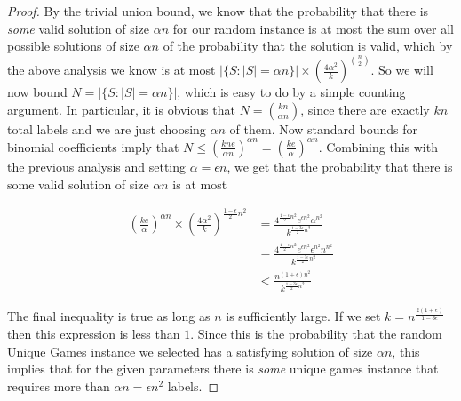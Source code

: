 \documentclass[11pt,letterpaper]{article}
\theoremstyle{definition}
\begin{document}
\begin{proof}
  By the trivial union bound, we know that the probability that there
  is \emph{some} valid solution of size $\alpha n$ for our random
  instance is at most the sum over all possible solutions of size
  $\alpha n$ of the probability that the solution is valid, which by
  the above analysis we know is at most $|\{S : |S| = \alpha n\}|
  \times \left(\frac{4\alpha^2}{k}\right)^{{n \choose 2}}$.  So we
  will now bound $N = |\{S : |S| = \alpha n\}|$, which is easy to do
  by a simple counting argument.  In particular, it is obvious that $N
  = {kn \choose \alpha n}$, since there are exactly $kn$ total labels
  and we are just choosing $\alpha n$ of them.  Now standard bounds
  for binomial coefficients imply that $N \leq \left(\frac{kne}{\alpha
      n}\right)^{\alpha n} = \left(\frac{ke}{\alpha}\right)^{\alpha
    n}$.  Combining this with the previous analysis and setting
  $\alpha = \epsilon n$, we get that the probability that there is
  some valid solution of size $\alpha n$ is at most

  \begin{align*}
    \left(\frac{ke}{\alpha}\right)^{\alpha n} \times \left(\frac{4\alpha^2}{k}\right)^{\frac{1-\epsilon}{2}n^2} &= \frac{4^{\frac{1-\epsilon}{2}n^2} e^{\epsilon n^2} \alpha^{n^2}}{k^{\frac{1-3\epsilon}{2}n^2}}\\
    & = \frac{4^{\frac{1-\epsilon}{2}n^2} e^{\epsilon n^2} \epsilon^{n^2} n^{n^2}}{k^{\frac{1-3\epsilon}{2}n^2}} \\
    & < \frac{n^{(1+\epsilon)n^2}}{k^{\frac{1-3\epsilon}{2}n^2}}
  \end{align*}

  The final inequality is true as long as $n$ is sufficiently large.  If
  we set $k = n^{\frac{2(1+\epsilon)}{1-3\epsilon}}$ then this expression is
  less than $1$.  Since this is the probability that the random Unique
  Games instance we selected has a satisfying solution of size $\alpha
  n$, this implies that for the given parameters there is \emph{some}
  unique games instance that requires more than $\alpha n = \epsilon
  n^2$ labels.
  \end{proof}
\end{document}
